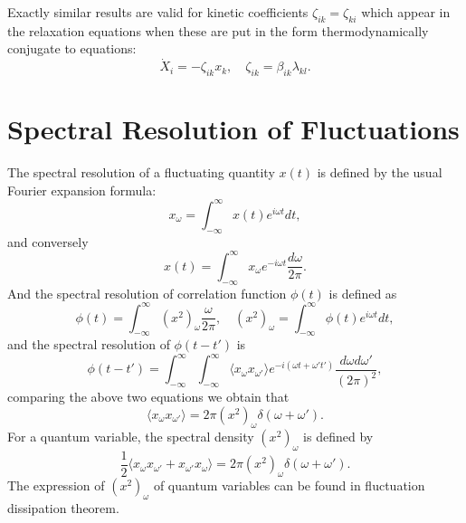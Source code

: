 \documentclass{book}
\newcommand{\average}[1]{\langle#1\rangle}
\numberwithin{equation}{section}
\begin{document}
Exactly similar results are valid for kinetic coefficients
$\zeta_{ik}=\zeta_{ki}$ which appear in the relaxation equations when these are
put in the form thermodynamically conjugate to equations:
\begin{equation}
  \dot{X}_i=-\zeta_{ik}x_k,\quad \zeta_{ik}=\beta_{ik}\lambda_{kl}.
\end{equation}

\section{Spectral Resolution of Fluctuations}
The spectral resolution of a fluctuating quantity $x(t)$ is defined by
the usual Fourier expansion formula:
\begin{equation}
  x_\omega=\int_{-\infty}^{\infty} x(t)e^{i\omega t}dt,
\end{equation}
and conversely 
\begin{equation}
  x(t)=\int_{-\infty}^{\infty}x_\omega e^{-i\omega t}\frac{d\omega}{2\pi}.
\end{equation}
And the spectral resolution of correlation function $\phi(t)$ is
defined as
\begin{equation}
  \phi(t)=\int_{-\infty}^{\infty}(x^2)_\omega\frac{\omega}{2\pi},\quad
  (x^2)_\omega=\int_{-\infty}^{\infty} \phi(t)e^{i\omega t}dt,
\end{equation}
and the spectral resolution of $\phi(t-t')$ is
\begin{equation}
  \phi(t-t')=\int_{-\infty}^{\infty}\int_{-\infty}^{\infty}\average{x_{\omega}x_{\omega'}}
  e^{-i(\omega t+\omega't')}\frac{d\omega d\omega'}{(2\pi)^2},
\end{equation}
comparing the above two equations we obtain that
\begin{equation}
  \average{x_{\omega}x_{\omega'}}=2\pi(x^2)_\omega\delta(\omega+\omega').
\end{equation}
For a quantum variable, the spectral density $(x^2)_\omega$ is defined by
\begin{equation}
  \frac{1}{2}\average{x_\omega x_{\omega'}+x_{\omega'}x_\omega}=
  2\pi(x^2)_\omega\delta(\omega+\omega').
\end{equation}
The expression of $(x^2)_\omega$ of quantum variables can be found in
fluctuation dissipation theorem.
\end{document}
